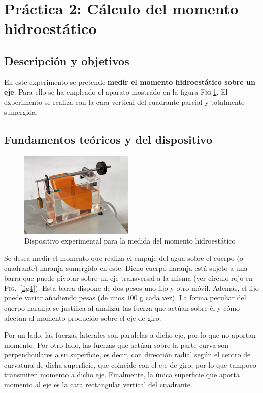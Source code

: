 \documentclass[12pt,a4paper]{article}
\begin{document}
\newpage
\section*{Práctica 2: Cálculo del momento hidroestático}
\subsection*{Descripción y objetivos}
En este experimento se pretende \textbf{medir el momento hidroestático sobre un eje}. Para ello se ha empleado el aparato mostrado en la figura \textsc{Fig.}\ref{fig3}. El experimento se realiza con la cara vertical del cuadrante parcial y totalmente sumergida.

\subsection*{Fundamentos teóricos y del dispositivo}
\begin{figure}
\vspace{-0.5cm}
 	 \begin{center}
  \includegraphics[width=0.48\textwidth]{fotos/momento_hidro}
  	 \end{center}
  	 \vspace{-0.5cm}
  	\caption{Dispositivo experimental para la medida del momento hidroestático}
  	\label{fig3}
  	\vspace{-0.5cm}
\end{figure}
Se desea medir el momento que realiza el empuje del agua sobre el cuerpo (o cuadrante) naranja sumergido en este. Dicho cuerpo naranja está sujeto a una barra que puede pivotar sobre un eje transversal a la misma (ver círculo rojo en \textsc{Fig.}~\ref{fig4}). Esta barra dispone de dos pesos uno fijo y otro móvil. Además, el fijo puede variar añadiendo pesas (de unos $100$ g cada vez). La forma peculiar del cuerpo naranja se justifica al analizar las fuerza que actúan sobre él y cómo afectan al momento producido sobre el eje de giro. 

Por un lado, las fuerzas laterales son paralelas a dicho eje, por lo que no aportan momento. Por otro lado,  las fuerzas que actúan sobre la parte curva son perpendiculares a su superficie, es decir, con dirección radial según el centro de curvatura de dicha superficie, que coincide con el eje de giro, por lo que tampoco transmiten momento a dicho eje. Finalmente, la única superficie que aporta momento al eje es la cara rectangular vertical del cuadrante.
\end{document}
